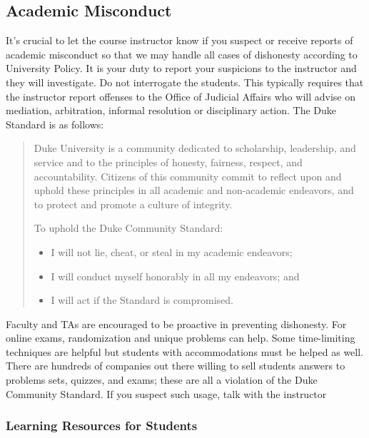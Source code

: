 \documentclass[
]{article}
\begin{document}
\hypertarget{academic-misconduct}{%
\subsection{Academic Misconduct}\label{academic-misconduct}}

It's crucial to let the course instructor know if you suspect or receive reports of academic misconduct so that we may handle all cases of dishonesty according to University Policy. It is your duty to report your suspicions to the instructor and they will investigate. Do not interrogate the students. This typically requires that the instructor report offenses to the Office of Judicial Affairs who will advise on mediation, arbitration, informal resolution or disciplinary action. The Duke Standard is as follows:

\begin{quote}
Duke University is a community dedicated to scholarship, leadership, and service and to the principles of honesty, fairness, respect, and accountability. Citizens of this community commit to reflect upon and uphold these principles in all academic and non-academic endeavors, and to protect and promote a culture of integrity.

To uphold the Duke Community Standard:

\begin{itemize}
\item
  I will not lie, cheat, or steal in my academic endeavors;
\item
  I will conduct myself honorably in all my endeavors; and
\item
  I will act if the Standard is compromised.
\end{itemize}
\end{quote}

Faculty and TAs are encouraged to be proactive in preventing dishonesty. For online exams, randomization and unique problems can help. Some time-limiting techniques are helpful but students with accommodations must be helped as well. There are hundreds of companies out there willing to sell students answers to problems sets, quizzes, and exams; these are all a violation of the Duke Community Standard. If you suspect such usage, talk with the instructor

\hypertarget{learning-resources-for-students}{%
\subsubsection{Learning Resources for Students}\label{learning-resources-for-students}}
\end{document}
